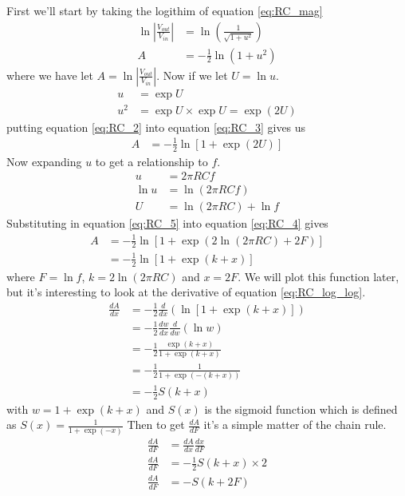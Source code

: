 First we'll start by taking the logithim of equation \ref{eq:RC_mag}
\begin{align}
  \ln \left|\frac{V_{out}}{V_{in}}\right| &= \ln \left( \frac{1}{\sqrt{1+u^2}} \right) \nonumber \\
  A&=-\frac{1}{2}\ln \left( 1+u^2 \right)
\end{align}
where we have let $A=\ln \left|\frac{V_{out}}{V_{in}}\right|$. Now if we let
$U=\ln u$. \label{eq:RC_2}
\begin{align}
  u &= \exp U \nonumber \\
  u^2 &= \exp U \times \exp U = \exp \left( 2 U\right)\label{eq:RC_3}
\end{align}
putting equation \ref{eq:RC_2} into equation \ref{eq:RC_3} gives us
\begin{align}
  A&=-\frac{1}{2}\ln \left[ 1+\exp \left( 2 U\right) \right] \label{eq:RC_4}
\end{align}
Now expanding $u$ to get a relationship to $f$.
\begin{align}
  u &= 2 \pi R C f \nonumber \\
  \ln u &= \ln \left( 2 \pi R C f \right) \nonumber \\
  U &= \ln \left( 2 \pi R C \right)+ \ln f \label{eq:RC_5}
\end{align}
Substituting in equation \ref{eq:RC_5} into equation \ref{eq:RC_4} gives
\begin{align}
  A&=-\frac{1}{2}\ln \left[ 1+\exp \left( 2 \ln \left( 2 \pi R C \right) + 2 F\right) \right] \nonumber \\
  &=-\frac{1}{2}\ln \left[ 1+\exp \left( k + x \right) \right] \label{eq:RC_log_log}
\end{align}
where $F=\ln f$, $k=2 \ln \left( 2 \pi R C \right)$ and $x=2F$.
We will plot this function later, but it's interesting to look at the derivative of equation \ref{eq:RC_log_log}.
\begin{align}
  \frac{dA}{dx}&=-\frac{1}{2} \frac{d}{dx}\left(\ln \left[ 1+\exp \left( k + x \right) \right]\right) \nonumber \\
  &=-\frac{1}{2} \frac{d w}{dx}\frac{d}{dw}\left(\ln w\right) \nonumber \\
  &=-\frac{1}{2} \frac{\exp \left( k + x \right)}{1+\exp \left( k + x \right)} \nonumber \\
  &=-\frac{1}{2} \frac{1}{1+\exp \left( -(k+x) \right)} \nonumber \\
  &=-\frac{1}{2} S(k+x) \label{eq:RC_6}
\end{align}
with $w=1+\exp \left( k + x \right)$ and $S(x)$ is the sigmoid function which is
defined as $S(x)=\frac{1}{1+\exp\left(-x\right)}$
Then to get $\frac{dA}{dF}$ it's a simple matter of the chain rule.
\begin{align}
  \frac{dA}{dF} &= \frac{dA}{dx}\frac{dx}{dF} \nonumber \\
  \frac{dA}{dF}&=-\frac{1}{2} S(k+x)\times 2 \nonumber \\
  \frac{dA}{dF}&= -S(k+2F)
\end{align}

